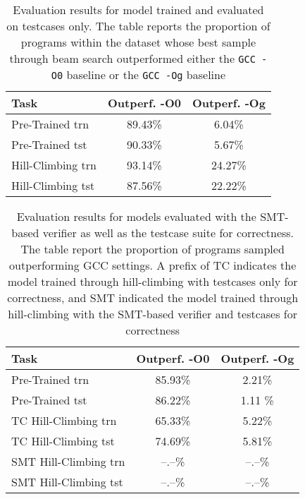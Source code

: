 \documentclass{article}
\begin{document}
\begin{table}[t]
\caption{Evaluation results for model trained and evaluated on testcases only. The table reports the proportion of programs within the dataset whose best sample through beam search outperformed either the \texttt{GCC -O0} baseline or the \texttt{GCC -Og} baseline}

\label{tab:random_generation_results}
\vskip 0.15in
\begin{center}
\begin{small}
\begin{sc}
\begin{tabular}{lcc}
\toprule
Task & Outperf. -O0 & Outperf. -Og \\
\midrule
Pre-Trained trn   & 89.43\% & 6.04\% \\
Pre-Trained tst    & 90.33\% & 5.67\% \\
Hill-Climbing trn  & 93.14\% & 24.27\% \\
Hill-Climbing tst  & 87.56\% & 22.22\% \\
\bottomrule
\end{tabular}
\end{sc}
\end{small}
\end{center}
\vskip -0.1in
\end{table}


\begin{table}[t]
\caption{Evaluation results for models evaluated with the SMT-based verifier as well as the testcase suite for correctness. The table report the proportion of programs sampled outperforming GCC settings. A prefix of \textsc{TC} indicates the model trained through hill-climbing with testcases only for correctness, and \textsc{SMT} indicated the model trained through hill-climbing with the SMT-based verifier and testcases for correctness}
\label{tab:z3_results}
\vskip 0.15in
\begin{center}
\begin{small}
\begin{sc}
\begin{tabular}{lcc}
\toprule
Task & Outperf. -O0 & Outperf. -Og \\
\midrule
Pre-Trained trn   & 85.93\% & 2.21\% \\
Pre-Trained tst    & 86.22\% & 1.11 \% \\
TC Hill-Climbing trn  & 65.33\% & 5.22\% \\
TC Hill-Climbing tst  & 74.69\% & 5.81\% \\
SMT Hill-Climbing trn  & --.--\% & --.--\% \\
SMT Hill-Climbing tst  & --.--\% & --.--\% \\
\bottomrule
\end{tabular}
\end{sc}
\end{small}
\end{center}
\vskip -0.1in
\end{table}
\end{document}
